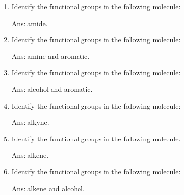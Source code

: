 \documentclass[main.tex]{subfiles}
\begin{document}
\begin{multicols*}{2}
\begin{enumerate}
\item Identify the functional groups in the following molecule:
\begin{center}
\end{center}
\begin{flushright}\small Ans: amide.\end{flushright}




\item Identify the functional groups in the following molecule:
\begin{center}
\end{center}
\begin{flushright}\small Ans: amine and aromatic.\end{flushright}

\item Identify the functional groups in the following molecule:
\begin{center}
\end{center}
\begin{flushright}\small Ans: alcohol and aromatic.\end{flushright}

\item Identify the functional groups in the following molecule:
\begin{center}
\end{center}
\begin{flushright}\small Ans: alkyne.\end{flushright}

\item Identify the functional groups in the following molecule:
\begin{center}
\end{center}
\begin{flushright}\small Ans: alkene.\end{flushright}

\item Identify the functional groups in the following molecule:
\begin{center}
\end{center}
\begin{flushright}\small Ans: alkene and alcohol.\end{flushright}



\end{enumerate}
\end{multicols*}
\end{document}
